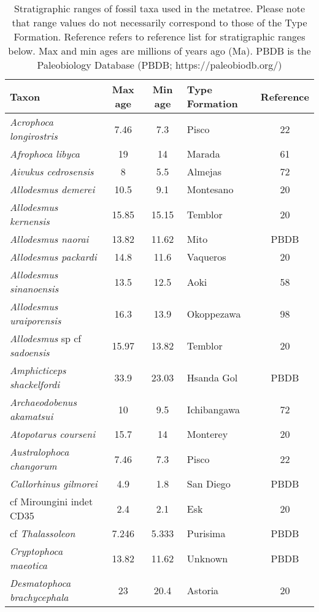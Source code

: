 \begin{longtable}{p{}cclc}

\caption{Stratigraphic ranges of fossil taxa used in the metatree. Please note that range values do not necessarily correspond to those of the Type Formation. Reference refers to reference list for stratigraphic ranges below. Max and min ages are millions of years ago (Ma). PBDB is the Paleobiology Database (PBDB; https://paleobiodb.org/)}\\

\hline
\textbf{Taxon} & \textbf{Max age} & \textbf{Min age} & \textbf{Type Formation} & \textbf{Reference}\\
\hline
\textit{Acrophoca longirostris} & 	7.46	&	7.3	&	Pisco	&22\\
\textit{Afrophoca libyca} & 	19	&	14	&	Marada	& 61\\
\textit{Aivukus cedrosensis} & 	8	&	5.5	&	Almejas	&72\\
\textit{Allodesmus demerei} & 	10.5	&	9.1	&	Montesano	&20\\
\textit{Allodesmus kernensis} & 	15.85	&	15.15	&	Temblor	&20\\
\textit{Allodesmus naorai} & 	13.82	&	11.62	&	Mito	&PBDB\\
\textit{Allodesmus packardi} & 	14.8	&	11.6	&	Vaqueros	&20\\
\textit{Allodesmus sinanoensis} & 	13.5	&	12.5	&	Aoki	&58\\
\textit{Allodesmus uraiporensis} & 	16.3	&	13.9	&	Okoppezawa	&98\\
\textit{Allodesmus} sp cf \textit{sadoensis} & 	15.97	&	13.82	&	Temblor	&20\\
\textit{Amphicticeps shackelfordi} & 	33.9	&	23.03	&	Hsanda Gol	&PBDB\\
\textit{Archaeodobenus akamatsui} & 	10	&	9.5	&	Ichibangawa	&72\\
\textit{Atopotarus courseni} & 	15.7	&	14	&	Monterey	&20\\
\textit{Australophoca changorum} & 	7.46	&	7.3	&	Pisco	&22\\
\textit{Callorhinus gilmorei} & 	4.9	&	1.8	&	San Diego	&PBDB\\
cf Miroungini indet CD35 & 	2.4	&	2.1	&	Esk	&20\\
cf \textit{Thalassoleon} & 	7.246	&	5.333	&	Purisima	&PBDB\\
\textit{Cryptophoca maeotica} & 	13.82	&	11.62	&	Unknown	&PBDB\\
\textit{Desmatophoca brachycephala} & 	23	&	20.4	&	Astoria	&20\\

\end{longtable}
